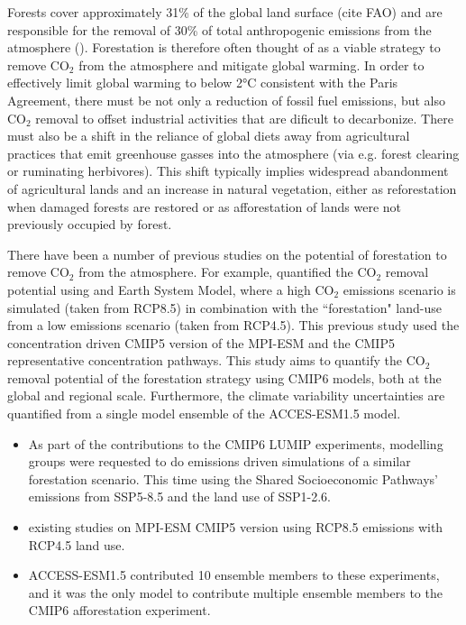 \documentclass[]{article}
\begin{document}
Forests cover approximately 31\% of the global land surface (cite FAO) and are responsible for the removal of 30\% of total anthropogenic emissions from the atmosphere (\cite{friedlingstein_global_2022}).
Forestation is therefore often thought of as a viable strategy to remove CO$_2$ from the atmosphere and mitigate global warming.
In order to effectively limit global warming to below 2°C consistent with the Paris Agreement, there must be not only a reduction of fossil fuel emissions, but also CO$_2$ removal to offset industrial activities that are dificult to decarbonize.
There must also be a shift in the reliance of global diets away from agricultural practices that emit greenhouse gasses into the atmosphere (via e.g. forest clearing or ruminating herbivores).
This shift typically implies widespread abandonment of agricultural lands and an increase in natural vegetation, either as reforestation when damaged forests are restored or as afforestation of lands were not previously occupied by forest.

There have been a number of previous studies on the potential of forestation to remove CO$_2$ from the atmosphere. For example, \cite{sonntag_reforestation_2016} quantified the CO$_2$ removal potential using and Earth System Model, where a high CO$_2$ emissions scenario is simulated (taken from RCP8.5) in combination with the ``forestation" land-use from a low emissions scenario (taken from RCP4.5).
This previous study used the concentration driven CMIP5 version of the MPI-ESM and the CMIP5 representative concentration pathways.
This study aims to quantify the CO$_2$ removal potential of the forestation strategy using CMIP6 models, both at the global and regional scale.
Furthermore, the climate variability uncertainties are quantified from a single model ensemble of the ACCES-ESM1.5 model.

\begin{itemize}
    \item As part of the contributions to the CMIP6 LUMIP experiments, modelling groups were requested to do emissions driven simulations of a similar forestation scenario. This time using the Shared Socioeconomic Pathways' emissions from SSP5-8.5 and the land use of SSP1-2.6.
    \item existing studies on MPI-ESM CMIP5 version using RCP8.5 emissions with RCP4.5 land use. \cite{sonntag_reforestation_2016} \cite{sonntag_quantifying_2018}
    \item ACCESS-ESM1.5 contributed 10 ensemble members to these experiments, and it was the only model to contribute multiple ensemble members to the CMIP6 afforestation experiment.
\end{itemize}
\end{document}
